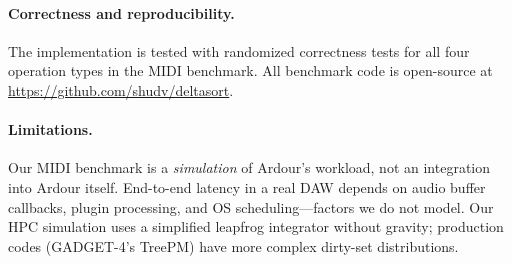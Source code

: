 \paragraph{Correctness and reproducibility.}
The \DeltaSort implementation is tested with randomized correctness tests
for all four operation types in the MIDI benchmark.
All benchmark code is open-source at \url{https://github.com/shudv/deltasort}.

\paragraph{Limitations.}
Our MIDI benchmark is a \emph{simulation} of Ardour's workload, not an
integration into Ardour itself.
End-to-end latency in a real DAW depends on audio buffer callbacks, plugin
processing, and OS scheduling---factors we do not model.
Our HPC simulation uses a simplified leapfrog integrator without gravity;
production codes (GADGET-4's TreePM) have more complex dirty-set distributions.
